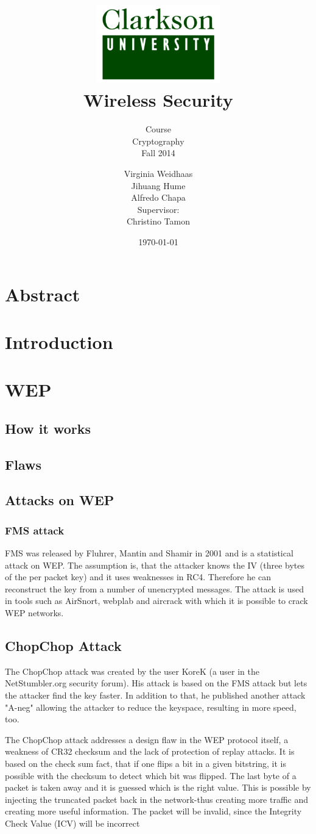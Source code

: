 \documentclass[a4paper,12pt,pagesize,headsepline,bibtotoc,titlepage]{scrartcl}
\title{
	\includegraphics*[width=0.4\textwidth]{clarkson.png}\\
	\vspace{24pt}
	Wireless Security
}
\subtitle{
	Course\\
	Cryptography\\
	Fall 2014
}
\author{
	Virginia Weidhaas\\[12pt]
    Jihuang Hume\\[12pt]
	Alfredo Chapa\\[12pt]	
	Supervisor:\\
	Christino Tamon
}
\date{\today}
\begin{document}
\maketitle
\tableofcontents
\newpage
\section{Abstract}
\section{Introduction}
\newpage
\section{WEP}

\subsection{How it works}
\subsection{Flaws}
\subsection{Attacks on WEP}
\subsubsection{FMS attack}
FMS was released by Fluhrer, Mantin and Shamir in 2001 \cite{fms} and is a statistical attack on WEP.
The assumption is, that the attacker knows the IV (three bytes of the per packet key) and it uses weaknesses in RC4. Therefore he can reconstruct the key from a number of unencrypted messages.
The attack is used in tools such as AirSnort, webplab and aircrack with which it is possible to crack WEP networks.


\subsection{ChopChop Attack}

The ChopChop attack was created by the user KoreK (a user in the NetStumbler.org security forum). His attack is based on the FMS attack but lets the attacker find the key faster. In addition to that, he published another attack "A-neg" allowing the attacker to reduce the keyspace, resulting in more speed, too.

The ChopChop attack addresses a design flaw in the WEP protocol itself, a weakness of CR32 checksum and the lack of protection of replay attacks.
It is based on the check sum fact, that if one flips a bit in a given bitstring, it is possible with the checksum to detect which bit was flipped. 
The last byte of a packet is taken away and it is guessed which is the right value.
This is possible by injecting the truncated packet back in the network-thus creating more traffic and creating more useful information. The packet will be invalid, since the Integrity Check Value (ICV) will be incorrect
\end{document}
